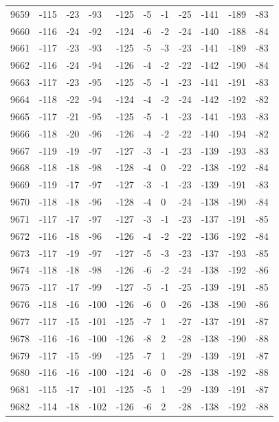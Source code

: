 \begin{table}[H]
\begin{tabular}{lllllllllll}
9659 & -115 & -23 & -93 & -125 & -5 & -1 & -25 & -141 & -189 & -83 \\
9660 & -116 & -24 & -92 & -124 & -6 & -2 & -24 & -140 & -188 & -84 \\
9661 & -117 & -23 & -93 & -125 & -5 & -3 & -23 & -141 & -189 & -83 \\
9662 & -116 & -24 & -94 & -126 & -4 & -2 & -22 & -142 & -190 & -84 \\
9663 & -117 & -23 & -95 & -125 & -5 & -1 & -23 & -141 & -191 & -83 \\
9664 & -118 & -22 & -94 & -124 & -4 & -2 & -24 & -142 & -192 & -82 \\
9665 & -117 & -21 & -95 & -125 & -5 & -1 & -23 & -141 & -193 & -83 \\
9666 & -118 & -20 & -96 & -126 & -4 & -2 & -22 & -140 & -194 & -82 \\
9667 & -119 & -19 & -97 & -127 & -3 & -1 & -23 & -139 & -193 & -83 \\
9668 & -118 & -18 & -98 & -128 & -4 & 0 & -22 & -138 & -192 & -84 \\
9669 & -119 & -17 & -97 & -127 & -3 & -1 & -23 & -139 & -191 & -83 \\
9670 & -118 & -18 & -96 & -128 & -4 & 0 & -24 & -138 & -190 & -84 \\
9671 & -117 & -17 & -97 & -127 & -3 & -1 & -23 & -137 & -191 & -85 \\
9672 & -116 & -18 & -96 & -126 & -4 & -2 & -22 & -136 & -192 & -84 \\
9673 & -117 & -19 & -97 & -127 & -5 & -3 & -23 & -137 & -193 & -85 \\
9674 & -118 & -18 & -98 & -126 & -6 & -2 & -24 & -138 & -192 & -86 \\
9675 & -117 & -17 & -99 & -127 & -5 & -1 & -25 & -139 & -191 & -85 \\
9676 & -118 & -16 & -100 & -126 & -6 & 0 & -26 & -138 & -190 & -86 \\
9677 & -117 & -15 & -101 & -125 & -7 & 1 & -27 & -137 & -191 & -87 \\
9678 & -116 & -16 & -100 & -126 & -8 & 2 & -28 & -138 & -190 & -88 \\
9679 & -117 & -15 & -99 & -125 & -7 & 1 & -29 & -139 & -191 & -87 \\
9680 & -116 & -16 & -100 & -124 & -6 & 0 & -28 & -138 & -192 & -88 \\
9681 & -115 & -17 & -101 & -125 & -5 & 1 & -29 & -139 & -191 & -87 \\
9682 & -114 & -18 & -102 & -126 & -6 & 2 & -28 & -138 & -192 & -88 \\

\end{tabular}
\end{table}
